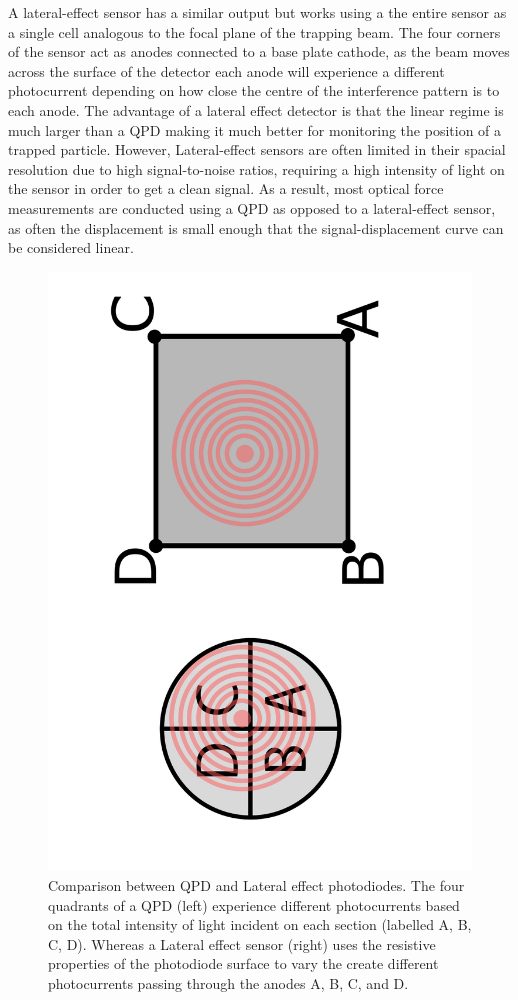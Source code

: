 A lateral-effect sensor has a similar output but works using a the 
entire sensor as a single cell analogous to the focal plane of the 
trapping beam. The four corners of the sensor act as anodes connected 
to a base plate cathode, as the beam moves across the surface of the 
detector each anode will experience a different photocurrent depending 
on how close the centre of the interference pattern is to each anode. 
The advantage of a lateral effect detector is that the linear regime 
is much larger than a QPD making it much better for monitoring the 
position of a trapped particle. However, Lateral-effect sensors are 
often limited in their spacial resolution due to high signal-to-noise 
ratios, requiring a high intensity of light on the sensor in order to 
get a clean signal. As a result, most optical force measurements are 
conducted using a QPD as opposed to a lateral-effect sensor, as often 
the displacement is small enough that the signal-displacement curve 
can be considered linear.
\begin{figure}[h!]
	\centering
	\includegraphics[height=\linewidth, angle=270]{QPD_Lateral_effect.pdf}
	\caption{Comparison between QPD and Lateral effect photodiodes.
		The four quadrants of a QPD (left) experience different photocurrents
		based on the total intensity of light incident on each section 
		(labelled A, B, C, D). 
		Whereas a Lateral effect sensor (right) uses the resistive properties
		of the photodiode surface to vary the create different photocurrents 
		passing through the anodes A, B, C, and D.}
\end{figure}

